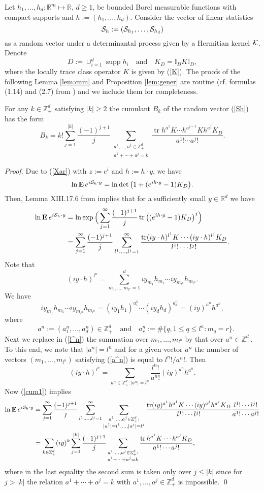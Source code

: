 \documentclass{article}
\numberwithin{equation}{section}
\newcommand{\mR}{\mathbb{R}}
\newcommand{\mZ}{\mathbb{Z}}
\newcommand{\mI}{\mathbb{I}}
\newcommand{\SSS}{{\cal S}}
\newcommand{\KK}{{\cal K}}
\newcommand{\supp}{\operatorname{supp}}
\newcommand{\tr}{\operatorname{tr}}
\newcommand{\MO}{\mbox{\bf E}\,}
\newcommand{\fr}{\frac}
\newcommand{\qmb}{\quad\mbox}
\newcommand{\qu}{\quad}
\newcommand{\sli}{\sum\limits}
\newcommand{\lbl}{\label}
\newcommand{\rprop}{Proposition \nolinebreak}
\newcommand{\rlem}{Lemma \nolinebreak}
\newcommand{\bee}{\begin{equation}}
\newcommand{\eee}{\end{equation}}
\newcommand{\bl}{\begin{lem}}
\newcommand{\el}{\end{lem}}
\newcommand{\non}{\nonumber}
\newcommand{\sck}{\substack}
\newcommand{\Zp}{\mathbb{Z}^d_+}
\begin{document}
Let $h_1,\ldots, h_d:\mR^m\mapsto\mR$, $d\geq 1$, be
bounded Borel measurable functions with compact supports
and
$h:=(h_1,\ldots,h_d)$.
Consider the vector of linear statistics
\bee\lbl{Sh}
\SSS_h:=(\SSS_{h_1},\ldots,\SSS_{h_d})
\eee
as a random vector under a determinantal process given by a Hermitian kernel $\KK$.
Denote
\bee\lbl{DDD}
D:=\cup_{i=1}^d\supp h_i \qmb{and}\qu K_D=\mI_D K\mI_D,
\eee
where the locally trace class operator $K$ is given by (\ref{K}).
The proofs of the following \rlem\ref{lem:cum} and \rprop\ref{lem:gener} are routine (cf. formulas (1.14) and (2.7) from \cite{So00b}) and we include them for completeness.
\bl\label{lem:cum}
For any $k\in\Zp$ satisfying $|k|\geq 2$ the cumulant $B_k$ of the random vector (\ref{Sh}) has the form
\bee
\lbl{B^N_k}
B_k=k!\sli_{j=1}^{|k|}\fr{(-1)^{j+1}}{j}\sli_{\sck{a^1,\ldots,a^j\in\Zp: \\ a^1+\cdots+a^j=k}}
\fr{\tr h^{a^1} K \cdots h^{a^{j-1}} K h^{a^j} K_D}{a^1!\cdots a^j!}.
\eee
\el
{\it Proof.}
Due to (\ref{Xar}) with $z:=e^i$ and $h:=h\cdot y$, we have
$$
\ln \MO e^{i\SSS_h\cdot y}
=\ln\det\big(1+ (e^{ih\cdot y}-1) K_D \big).
$$
Then, Lemma XIII.17.6 from \cite{RS} implies that for a sufficiently small $y\in\mR^d$ we have
\begin{align}\non
\ln \MO e^{i\SSS_h\cdot y}
&=\ln\exp\Big(\sli_{j=1}^\infty\fr{(-1)^{j+1}}{j} \tr\big( (e^{ih\cdot y}-1) K_D\big)^j \Big)
\\ \lbl{cum1}
&= \sli_{j=1}^\infty\fr{(-1)^{j+1}}{j}\sli_{l^1,\ldots, l^j=1}^\infty
\fr{\tr (iy\cdot h)^{l^1} K\cdots(iy\cdot h)^{l^j} K_D}{l^1!\cdots l^j!}.
\end{align}
Note that
\bee\label{l^n}
(iy\cdot h)^{l^n}=\sum_{m_1,\ldots,m_{l^n}=1}^d iy_{m_1}h_{m_1}\cdots iy_{m_{l^n}}h_{m_{l^n}}.
\eee
We have
$$
iy_{m_1}h_{m_1}\cdots iy_{m_{l^n}}h_{m_{l^n}}
=(iy_1h_1)^{a^n_1}\cdots (iy_dh_d)^{a^n_d}=(iy)^{a^n} h^{a^n},
$$
where
\bee\label{a^n}
\qu a^n:=(a^n_1,\ldots,a^n_d)\in\Zp \qmb{and}\qu a^n_r:=\#\{q, 1\leq q\leq l^n: m_q=r\}.
\eee
Next we replace in (\ref{l^n}) the summation over $m_1,\ldots,m_{l^n}$ by that over $a^n\in\mZ^d_+$. To this end, we note that
$|a^n|=l^n$ and
 for a given vector $a^n$ the number of vectors $(m_1,\ldots,m_{l^n})$ satisfying (\ref{a^n}) is equal to $l^n!/a^n!$. Then
$$
(iy\cdot h)^{l^n}=\sli_{a^n\in\Zp: |a^n|=l^n}\fr{l^n!}{a^n!}(iy)^{a^n}h^{a^n}.
$$
Now (\ref{cum1}) implies
\begin{align}\non
\ln \MO e^{i\SSS_h\cdot y}
&=\sli_{j=1}^\infty\fr{(-1)^{j+1}}{j}\sli_{l^1,\ldots, l^j=1}^\infty
\sli_{\sck{a^1,\ldots, a^j\in\Zp: \\ |a^1|=l^1,\ldots,|a^j|=l^j}}
\fr{\tr (iy)^{a^1}h^{a^1}K\cdots (iy)^{a^j}h^{a^j}K_D}{l^1!\cdots l^j!}
\fr{l^1!\cdots l^j!}{a^1!\cdots a^j!} \\\non
&=\sli_{k\in\Zp}(iy)^k\sli_{j=1}^{|k|}\fr{(-1)^{j+1}}{j}
\sli_{\sck{a^1,\ldots, a^j\in\Zp: \\ a^1+\cdots+a^j=k}}
\fr{\tr h^{a^1}K\cdots h^{a^j}K_D}{a^1!\cdots a^j!},
\end{align}
where in the last equality the second sum is taken only over $j\leq |k|$ since for $j>|k|$ the relation $a^1+\cdots+a^j=k$ with $a^1,\ldots,
a^j\in\Zp$ is impossible.
\qed
\end{document}
